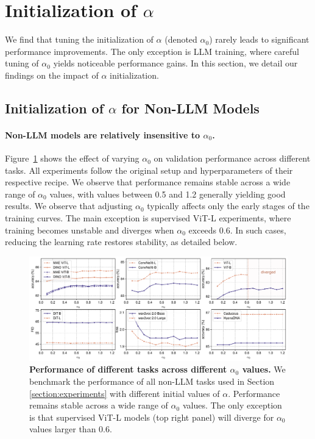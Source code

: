 \section{Initialization of $\alpha$}
\label{section:alpha_init}


We find that tuning the initialization of $\alpha$ (denoted $\alpha_0$) rarely leads to significant performance improvements.
The only exception is LLM training, where careful tuning of $\alpha_0$ yields noticeable performance gains.
In this section, we detail our findings on the impact of $\alpha$ initialization.

\subsection{Initialization of $\alpha$ for Non-LLM Models}

\paragraph{Non-LLM models are relatively insensitive to $\alpha_0$.}
Figure~\ref{figure:accuracy_vs_alpha} shows the effect of varying $\alpha_0$ on validation performance across different tasks. All experiments follow the original setup and hyperparameters of their respective recipe.
We observe that performance remains stable across a wide range of $\alpha_0$ values, with values between 0.5 and 1.2 generally yielding good results. We observe that adjusting $\alpha_0$ typically affects only the early stages of the training curves.
The main exception is supervised ViT-L experiments, where training becomes unstable and diverges when $\alpha_0$ exceeds 0.6. In such cases, reducing the learning rate restores stability, as detailed below.


\begin{figure}[t]
\vskip -0.3in
\centering
\includegraphics[width=\textwidth]{figures/accuracy_vs_alpha.pdf}
\caption{\textbf{Performance of different tasks across different $\alpha_0$ values.} We benchmark the performance of all non-LLM tasks used in Section \ref{section:experiments} with different initial values of $\alpha$. Performance remains stable across a wide range of $\alpha_0$ values. The only exception is that supervised ViT-L models (top right panel) will diverge for $\alpha_0$ values larger than 0.6.}\label{figure:accuracy_vs_alpha}
\vskip -0.15in
\end{figure}


